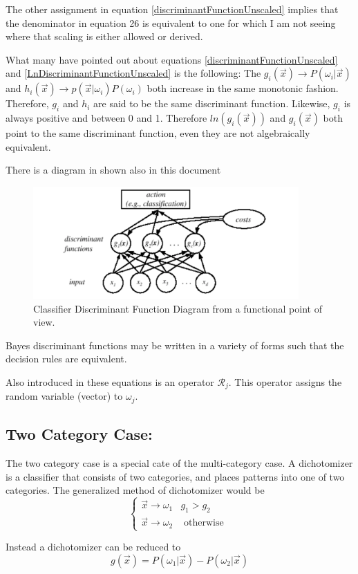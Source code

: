 \documentclass[11pt]{article}
\begin{document}
The other assignment in equation \ref{discriminantFunctionUnscaled} implies that the denominator in equation 26 is equivalent to one for which I am not seeing where that scaling is either allowed or derived.  

What many have pointed out about equations \ref{discriminantFunctionUnscaled} and \ref{LnDiscriminantFunctionUnscaled} is the following:
The $g_i(\vec{x}) \to P(\omega_i | \vec{x})$ and $h_i(\vec{x}) \to p(\vec{x}|\omega_i)P(\omega_i)$ both increase in the same monotonic fashion.  Therefore, $g_i$ and $h_i$ are said to be the same discriminant function.   Likewise, $g_i$ is always positive and between 0 and 1.   Therefore $ln(g_i(\vec{x}))$ and $g_i(\vec{x})$ both point to the same discriminant function, even they are not algebraically equivalent.  

There is a diagram in \cite[30]{duda-hart-stork} shown also in this document


\begin{figure}[htbp] %
   \centering
   \includegraphics[width=4in]{classifiersDiagramDiscriminantFunction.pdf} 
   \caption{Classifier Discriminant Function Diagram from a functional point of view.}
   \label{fig:example}
\end{figure}

Bayes discriminant functions may be written in a variety of forms such that the decision rules are equivalent.  

Also introduced in these equations is an operator $\mathcal{R}_j$.  This operator assigns the random variable (vector) to $\omega_j$.

\subsection{Two Category Case:}
The two category case is a special cate of the multi-category case.  A dichotomizer is a classifier that consists of two categories, and places patterns into one of two categories.    The generalized method of dichotomizer would be 
\[
\left\{
\begin{array}{ll}
\vec{x} \to \omega_1  &    g_1 > g_2 \\
\vec{x} \to \omega_2  &    \textrm{ otherwise }
\end{array}
\right.
\]

Instead a dichotomizer can be reduced to 
\[
	g(\vec{x}) = P(\omega_1 | \vec{x}) - P(\omega_2 | \vec{x})
\]



\end{document}
